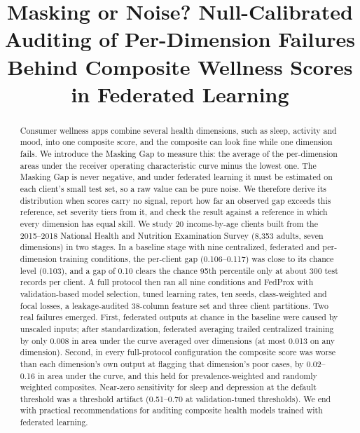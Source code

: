 \documentclass[conference]{IEEEtran}
\begin{document}
\title{Masking or Noise? Null-Calibrated Auditing of Per-Dimension Failures Behind Composite Wellness Scores in Federated Learning}

\author{
\and
{}
}

\maketitle

\begin{abstract}
Consumer wellness apps combine several health dimensions, such as sleep, activity and mood, into one composite score, and the composite can look fine while one dimension fails. We introduce the Masking Gap to measure this: the average of the per-dimension areas under the receiver operating characteristic curve minus the lowest one. The Masking Gap is never negative, and under federated learning it must be estimated on each client's small test set, so a raw value can be pure noise. We therefore derive its distribution when scores carry no signal, report how far an observed gap exceeds this reference, set severity tiers from it, and check the result against a reference in which every dimension has equal skill. We study 20 income-by-age clients built from the 2015--2018 National Health and Nutrition Examination Survey (8,353 adults, seven dimensions) in two stages. In a baseline stage with nine centralized, federated and per-dimension training conditions, the per-client gap (0.106--0.117) was close to its chance level (0.103), and a gap of 0.10 clears the chance 95th percentile only at about 300 test records per client. A full protocol then ran all nine conditions and FedProx with validation-based model selection, tuned learning rates, ten seeds, class-weighted and focal losses, a leakage-audited 38-column feature set and three client partitions. Two real failures emerged. First, federated outputs at chance in the baseline were caused by unscaled inputs; after standardization, federated averaging trailed centralized training by only 0.008 in area under the curve averaged over dimensions (at most 0.013 on any dimension). Second, in every full-protocol configuration the composite score was worse than each dimension's own output at flagging that dimension's poor cases, by 0.02--0.16 in area under the curve, and this held for prevalence-weighted and randomly weighted composites. Near-zero sensitivity for sleep and depression at the default threshold was a threshold artifact (0.51--0.70 at validation-tuned thresholds). We end with practical recommendations for auditing composite health models trained with federated learning.
\end{abstract}
\end{document}

